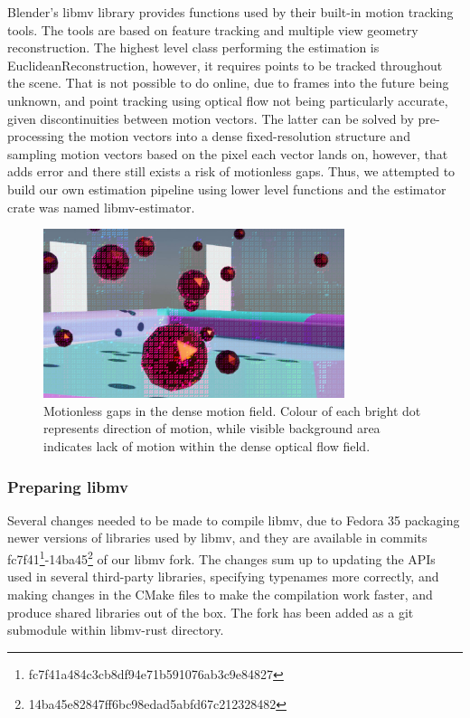 \documentclass[11pt,english]{report}
\begin{document}
Blender's libmv library provides functions used by their built-in motion tracking tools\cite{blender-motion-tracking}. The tools are based on feature tracking and multiple view geometry reconstruction. The highest level class performing the estimation is EuclideanReconstruction, however, it requires points to be tracked throughout the scene. That is not possible to do online, due to frames into the future being unknown, and point tracking using optical flow not being particularly accurate, given discontinuities between motion vectors. The latter can be solved by pre-processing the motion vectors into a dense fixed-resolution structure and sampling motion vectors based on the pixel each vector lands on, however, that adds error and there still exists a risk of motionless gaps. Thus, we attempted to build our own estimation pipeline using lower level functions and the estimator crate was named libmv-estimator.

\begin{figure}[!ht]
	\centering
	\includegraphics[width=250pt]{docs/report/mvec-gaps.jpg}
	\caption{\centering Motionless gaps in the dense motion field. Colour of each bright dot represents direction of motion, while visible background area indicates lack of motion within the dense optical flow field.}
\end{figure}

\subsubsection{Preparing libmv}

Several changes needed to be made to compile libmv, due to Fedora 35 packaging newer versions of libraries used by libmv, and they are available in commits fc7f41\footnote{fc7f41a484c3cb8df94e71b591076ab3c9e84827}-14ba45\footnote{14ba45e82847ff6bc98edad5abfd67c212328482} of our libmv fork\cite{libmv-fork}. The changes sum up to updating the APIs used in several third-party libraries, specifying typenames more correctly, and making changes in the CMake files to make the compilation work faster, and produce shared libraries out of the box. The fork has been added as a git submodule within libmv-rust directory.
\end{document}
